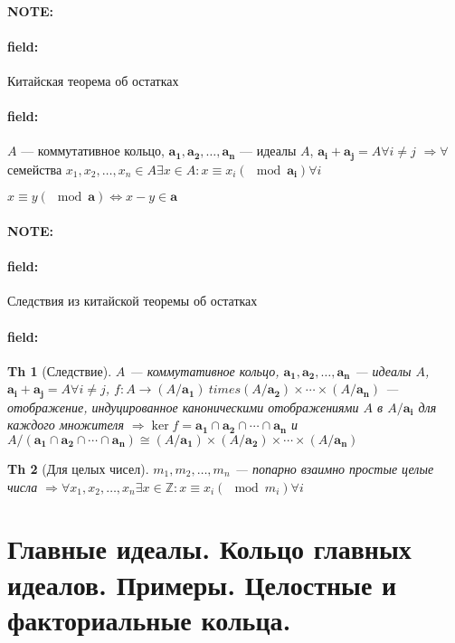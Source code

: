 \documentclass[12pt]{article}
\newenvironment{note}{\paragraph{NOTE:}}{}
\newenvironment{field}{\paragraph{field:}}{}
\newtheorem{theorem}{Th}
\begin{document}
\begin{note}
  \begin{field}
    Китайская теорема об остатках
  \end{field}
  \begin{field}
    $A$ --- коммутативное кольцо,
    $\mathbf{a_{1}}, \mathbf{a_{2}}, \ldots, \mathbf{a_{n}}$ --- идеалы $A$, $\mathbf{a_{i}} + \mathbf{a_{j}} = A \forall i \neq j$
    $\Rightarrow \forall$ семейства $x_{1}, x_{2}, \ldots, x_{n} \in A \exists x \in A: x \equiv x_{i} (\mod \mathbf{a_{i}}) \forall i$

    $x \equiv y (\mod \mathbf{a}) \Leftrightarrow x - y \in \mathbf{a}$

  \end{field}
\end{note}

\begin{note}
  \begin{field}
    Следствия из китайской теоремы об остатках
  \end{field}
  \begin{field}
    \begin{theorem}[Следствие]
      $A$ --- коммутативное кольцо,
    $\mathbf{a_{1}}, \mathbf{a_{2}}, \ldots, \mathbf{a_{n}}$ --- идеалы $A$,
    $\mathbf{a_{i}} + \mathbf{a_{j}} = A \forall i \neq j$,
    $f : A \rightarrow (A/ \mathbf{a_{1}}) \ times (A/ \mathbf{a_{2}}) \times \cdots \times (A/ \mathbf{a_{n}})$
    --- отображение, индуцированное каноническими отображениями $A$ в $A/ \mathbf{a_{i}}$ для каждого множителя
    $\Rightarrow \ker f = \mathbf{a_{1}} \cap \mathbf{a_{2}} \cap \cdots \cap \mathbf{a_{n}}$ и
    $A/(\mathbf{a_{1}} \cap \mathbf{a_{2}} \cap \cdots \cap \mathbf{a_{n}}) \cong (A/\mathbf{a_{1}}) \times (A/\mathbf{a_{2}}) \times \cdots \times (A/\mathbf{a_{n}})$
    \end{theorem}

    \begin{theorem}[Для целых чисел]
      $m_{1}, m_{2}, \ldots, m_{n}$ --- попарно взаимно простые целые числа
      $\Rightarrow \forall x_{1}, x_{2}, \ldots, x_{n} \exists x \in \mathbb{Z}: x \equiv x_{i} (\mod m_{i}) \forall i$
    \end{theorem}
  \end{field}
\end{note}

\section{Главные идеалы. Кольцо главных идеалов. Примеры. Целостные и
факториальные кольца.}
\end{document}
